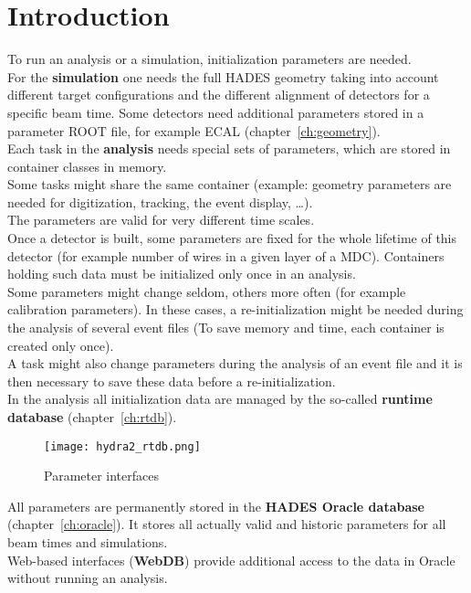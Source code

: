 \chapter[Introduction]{Introduction}

To run an analysis or a simulation, initialization parameters are needed.\\

For the \textbf{simulation} one needs the full HADES geometry taking into account different target configurations and 
the different alignment of detectors for a specific beam time. Some detectors need additional parameters stored in a 
parameter ROOT file, for example ECAL (chapter~\ref{ch:geometry}).\\

Each task in the \textbf{analysis} needs special sets of parameters, which are stored in container classes in memory.\\
Some tasks might share the same container (example: geometry parameters are needed for digitization, tracking, the 
event display, \ldots).\\

The parameters are valid for very different time scales.\\
Once a detector is built, some parameters are fixed for the whole lifetime of this detector (for example number of 
wires in a given layer of a MDC). Containers holding such data must be initialized only once in an analysis.\\
Some parameters might change seldom, others more often (for example calibration parameters). In these cases, a 
re-initialization might be needed during the analysis of several event files (To save memory and time, each container 
is created only once).\\
A task might also change parameters during the analysis of an event file and it is then necessary to save these data 
before a re-initialization.\\

In the analysis all initialization data are managed by the so-called \textbf{runtime database} (chapter~\ref{ch:rtdb}).
\begin{figure}[\htb]
  \centering
  \texttt{[image: hydra2\_rtdb.png]}
  \caption[Parameter interfaces]{Parameter interfaces} \label{fig:parameterInterfaces}
\end{figure}

All parameters are permanently stored in the \textbf{HADES Oracle database} (chapter~\ref{ch:oracle}). It stores all 
actually valid and historic parameters for all beam times and simulations.\\
Web-based interfaces (\textbf{WebDB}) provide additional access to the data in Oracle without running an analysis.\\

